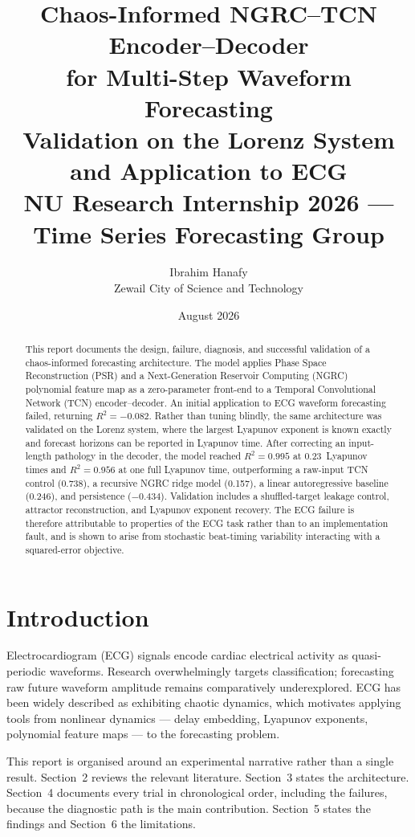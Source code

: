 \documentclass[11pt,a4paper]{article}
\title{%
  Chaos-Informed NGRC--TCN Encoder--Decoder\\
  for Multi-Step Waveform Forecasting\\[0.3em]
  \large Validation on the Lorenz System and Application to ECG\\[0.5em]
  \normalsize NU Research Internship 2026 --- Time Series Forecasting Group
}
\author{
  Ibrahim Hanafy\\
  Zewail City of Science and Technology
}
\date{August 2026}
\begin{document}
\maketitle

\begin{abstract}
This report documents the design, failure, diagnosis, and successful validation of a chaos-informed forecasting architecture.
The model applies Phase Space Reconstruction (PSR) and a Next-Generation Reservoir Computing (NGRC) polynomial feature map as a zero-parameter front-end to a Temporal Convolutional Network (TCN) encoder--decoder.
An initial application to ECG waveform forecasting failed, returning $R^2 = -0.082$.
Rather than tuning blindly, the same architecture was validated on the Lorenz system, where the largest Lyapunov exponent is known exactly and forecast horizons can be reported in Lyapunov time.
After correcting an input-length pathology in the decoder, the model reached $R^2 = 0.995$ at 0.23~Lyapunov times and $R^2 = 0.956$ at one full Lyapunov time, outperforming a raw-input TCN control (0.738), a recursive NGRC ridge model (0.157), a linear autoregressive baseline (0.246), and persistence ($-0.434$).
Validation includes a shuffled-target leakage control, attractor reconstruction, and Lyapunov exponent recovery.
The ECG failure is therefore attributable to properties of the ECG task rather than to an implementation fault, and is shown to arise from stochastic beat-timing variability interacting with a squared-error objective.
\end{abstract}

\tableofcontents
\newpage

\section{Introduction}

Electrocardiogram (ECG) signals encode cardiac electrical activity as quasi-periodic waveforms.
Research overwhelmingly targets classification; forecasting raw future waveform amplitude remains comparatively underexplored.
ECG has been widely described as exhibiting chaotic dynamics, which motivates applying tools from nonlinear dynamics --- delay embedding, Lyapunov exponents, polynomial feature maps --- to the forecasting problem.

This report is organised around an experimental narrative rather than a single result.
Section~2 reviews the relevant literature.
Section~3 states the architecture.
Section~4 documents every trial in chronological order, including the failures, because the diagnostic path is the main contribution.
Section~5 states the findings and Section~6 the limitations.
\end{document}
